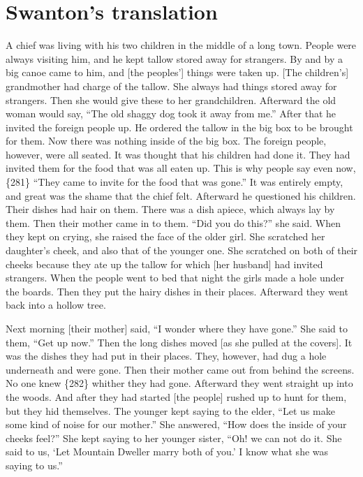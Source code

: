\section{Swanton’s translation}\label{sec:92-swanton-translation}

A chief was living with his two children in the middle of a long town.
People were always visiting him, and he kept tallow stored away for strangers.
By and by a big canoe came to him, and [the peoples’] things were taken up.
{}[The children’s] grandmother had charge of the tallow.
She always had things stored away for strangers.
Then she would give these to her grandchildren.
Afterward the old woman would say,
“The old shaggy dog took it away from me.”
After that he invited the foreign people up.
He ordered the tallow in the big box to be brought for them.
Now there was nothing inside of the big box.
The foreign people, however, were all seated.
It was thought that his children had done it.
They had invited them for the food that was all eaten up.
This is why people say even now,
\{281\} “They came to invite for the food that was gone.”
It was entirely empty, and great was the shame that the chief felt.
Afterward he questioned his children.
Their dishes had hair on them.
There was a dish apiece, which always lay by them.
Then their mother came in to them.
“Did you do this?”
she said.
When they kept on crying, she raised the face of the older girl.
She scratched her daughter’s cheek, and also that of the younger one.
She scratched on both of their cheeks because they ate up the tallow for which [her husband] had invited strangers.
When the people went to bed that night the girls made a hole under the boards.
Then they put the hairy dishes in their places.
Afterward they went back into a hollow tree.

Next morning [their mother] said,
“I wonder where they have gone.”
She said to them,
“Get up now.”
Then the long dishes moved [as she pulled at the covers].
It was the dishes they had put in their places.
They, however, had dug a hole underneath and were gone.
Then their mother came out from behind the screens.
No one knew \{282\} whither they had gone.
Afterward they went straight up into the woods.
And after they had started [the people] rushed up to hunt for them, but they hid themselves.
The younger kept saying to the elder,
“Let us make some kind of noise for our mother.”
She answered,
“How does the inside of your cheeks feel?”
She kept saying to her younger sister,
“Oh! we can not do it.
She said to us,
‘Let Mountain Dweller marry both of you.’
I know what she was saying to us.”

